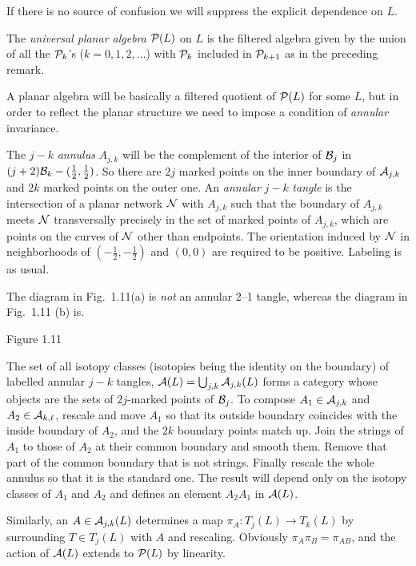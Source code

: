 If there is no source of confusion we will suppress the explicit
dependence on $L$.

 The {\it universal planar algebra}
$\P(L)$ on $L$ is the filtered algebra given by the union of all the
$\P_k$'s ($k=0,1,2,\dots$) with $\P_k$ included in $\P_{k+1}$ as in
the preceding remark.

\bs
A planar algebra will be basically a filtered quotient of $\P(L)$
for some $L$, but in order to reflect the planar structure we need
to impose a condition of {\it annular}
invariance.

 The $j\!-\!k$ {\it annulus} $A_{j,k}$ will
be the complement of the interior of $\b_j$ in
$(j+2)\b_k-(\frac 12,\frac 12)$. So there are $2j$ marked points
on the inner boundary of ${\cal A}_{j,k}$ and $2k$ marked points on
the outer one. An {\it annular} $j-k$ {\it tangle} is the
intersection of a planar network $\cal N$ with $A_{j,k}$ such that
the boundary of $A_{j,k}$ meets $\cal N$ transversally precisely
in the set of marked points of $A_{j,k}$, which are
points on the curves of $\cal N$ other than
endpoints.  The orientation induced by $\cal N$ in
neighborhoods of
$(-\frac 12,-\frac 12)$ and $(0,0)$ are
 required to be positive. Labeling is as
usual.

 The diagram in Fig.~1.11(a) is {\it not} an
annular 2--1 tangle, whereas the diagram in Fig.~1.11 (b) is.
\[
        
\]
\begin{center}
Figure 1.11
\end{center}

The set of all isotopy classes (isotopies being the identity on the
boundary) of labelled annular $j-k$ tangles, ${\cal A}(L)=\bigcup_{j,k}
{\cal A}_{j,k}(L)$ forms a category whose objects are the sets of
$2j$-marked points of $\b_j$. To compose $A_1\in{\cal A}_{j,k}$ and
$A_2\in{\cal A}_{k,\ell}$, rescale and move $A_1$ so that its outside
boundary coincides with the inside boundary of $A_2$, and the $2k$ 
boundary points match up. Join the strings of $A_1$ to those of $A_2$
at their common boundary and smooth them. Remove that part of the common
boundary that is not strings. Finally rescale the whole annulus so that it
is the standard one. 
The result will depend only on the
isotopy classes of $A_1$ and $A_2$ and defines an element
$A_2A_1$ in ${\cal A}(L)$.

Similarly, an $A\in{\cal A}_{j,k}(L)$ determines a map
$\pi_A:T_j(L)\to T_k(L)$ by surrounding $T\in T_j(L)$ with $A$ and
rescaling. Obviously $\pi_A\pi_B=\pi_{AB}$, and the action of
${\cal A}(L)$ extends to $\P(L)$ by linearity.

